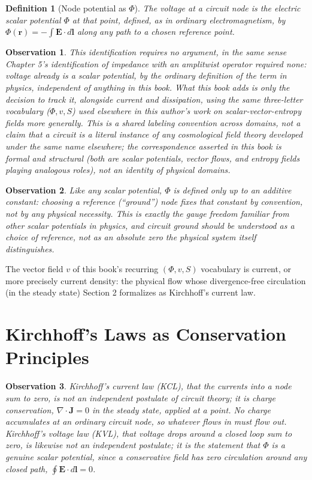 \documentclass[12pt]{article}
\newtheorem{definition}{Definition}
\newtheorem{observation}{Observation}
\begin{document}
\begin{definition}[Node potential as $\Phi$]
The voltage at a circuit node is the electric scalar potential $\Phi$ at that point, defined, as in ordinary electromagnetism, by $\Phi(\mathbf{r}) = -\int \mathbf{E}\cdot d\mathbf{l}$ along any path to a chosen reference point.
\end{definition}

\begin{observation}
This identification requires no argument, in the same sense Chapter 5's identification of impedance with an amplitwist operator required none: voltage already is a scalar potential, by the ordinary definition of the term in physics, independent of anything in this book. What this book adds is only the decision to track it, alongside current and dissipation, using the same three-letter vocabulary ($\Phi, v, S$) used elsewhere in this author's work on scalar-vector-entropy fields more generally. This is a shared labeling convention across domains, not a claim that a circuit is a literal instance of any cosmological field theory developed under the same name elsewhere; the correspondence asserted in this book is formal and structural (both are scalar potentials, vector flows, and entropy fields playing analogous roles), not an identity of physical domains.
\end{observation}

\begin{observation}
Like any scalar potential, $\Phi$ is defined only up to an additive constant: choosing a reference (``ground'') node fixes that constant by convention, not by any physical necessity. This is exactly the gauge freedom familiar from other scalar potentials in physics, and circuit ground should be understood as a choice of reference, not as an absolute zero the physical system itself distinguishes.
\end{observation}

The vector field $v$ of this book's recurring $(\Phi, v, S)$ vocabulary is current, or more precisely current density: the physical flow whose divergence-free circulation (in the steady state) Section 2 formalizes as Kirchhoff's current law.

\section{Kirchhoff's Laws as Conservation Principles}

\begin{observation}
Kirchhoff's current law (KCL), that the currents into a node sum to zero, is not an independent postulate of circuit theory; it is charge conservation, $\nabla\cdot\mathbf{J}=0$ in the steady state, applied at a point. No charge accumulates at an ordinary circuit node, so whatever flows in must flow out. Kirchhoff's voltage law (KVL), that voltage drops around a closed loop sum to zero, is likewise not an independent postulate; it is the statement that $\Phi$ is a genuine scalar potential, since a conservative field has zero circulation around any closed path, $\oint \mathbf{E}\cdot d\mathbf{l} = 0$.
\end{observation}
\end{document}
